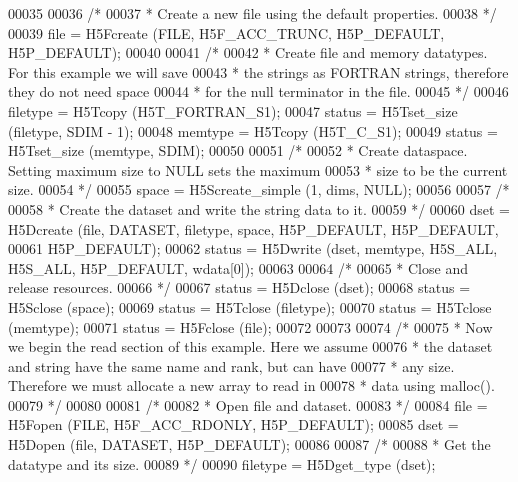 \begin{DoxyCode}
00035 
00036     \textcolor{comment}{/*}
00037 \textcolor{comment}{     * Create a new file using the default properties.}
00038 \textcolor{comment}{     */}
00039     file = H5Fcreate (FILE, H5F\_ACC\_TRUNC, H5P\_DEFAULT, H5P\_DEFAULT);
00040 
00041     \textcolor{comment}{/*}
00042 \textcolor{comment}{     * Create file and memory datatypes.  For this example we will save}
00043 \textcolor{comment}{     * the strings as FORTRAN strings, therefore they do not need space}
00044 \textcolor{comment}{     * for the null terminator in the file.}
00045 \textcolor{comment}{     */}
00046     filetype = H5Tcopy (H5T\_FORTRAN\_S1);
00047     status = H5Tset\_size (filetype, SDIM - 1);
00048     memtype = H5Tcopy (H5T\_C\_S1);
00049     status = H5Tset\_size (memtype, SDIM);
00050 
00051     \textcolor{comment}{/*}
00052 \textcolor{comment}{     * Create dataspace.  Setting maximum size to NULL sets the maximum}
00053 \textcolor{comment}{     * size to be the current size.}
00054 \textcolor{comment}{     */}
00055     space = H5Screate\_simple (1, dims, NULL);
00056 
00057     \textcolor{comment}{/*}
00058 \textcolor{comment}{     * Create the dataset and write the string data to it.}
00059 \textcolor{comment}{     */}
00060     dset = H5Dcreate (file, DATASET, filetype, space, H5P\_DEFAULT, H5P\_DEFAULT,
00061                 H5P\_DEFAULT);
00062     status = H5Dwrite (dset, memtype, H5S\_ALL, H5S\_ALL, H5P\_DEFAULT, wdata[0]);
00063 
00064     \textcolor{comment}{/*}
00065 \textcolor{comment}{     * Close and release resources.}
00066 \textcolor{comment}{     */}
00067     status = H5Dclose (dset);
00068     status = H5Sclose (space);
00069     status = H5Tclose (filetype);
00070     status = H5Tclose (memtype);
00071     status = H5Fclose (file);
00072 
00073 
00074     \textcolor{comment}{/*}
00075 \textcolor{comment}{     * Now we begin the read section of this example.  Here we assume}
00076 \textcolor{comment}{     * the dataset and string have the same name and rank, but can have}
00077 \textcolor{comment}{     * any size.  Therefore we must allocate a new array to read in}
00078 \textcolor{comment}{     * data using malloc().}
00079 \textcolor{comment}{     */}
00080 
00081     \textcolor{comment}{/*}
00082 \textcolor{comment}{     * Open file and dataset.}
00083 \textcolor{comment}{     */}
00084     file = H5Fopen (FILE, H5F\_ACC\_RDONLY, H5P\_DEFAULT);
00085     dset = H5Dopen (file, DATASET, H5P\_DEFAULT);
00086 
00087     \textcolor{comment}{/*}
00088 \textcolor{comment}{     * Get the datatype and its size.}
00089 \textcolor{comment}{     */}
00090     filetype = H5Dget\_type (dset);

\end{DoxyCode}
